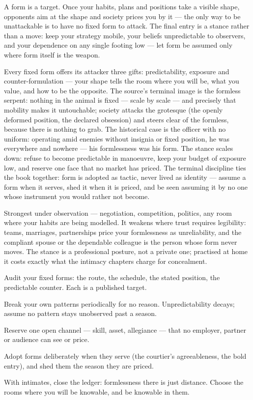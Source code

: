 \begin{core}
A form is a target. Once your habits, plans and positions take a visible shape, opponents aim at the shape and society prices you by it --- the only way to be unattackable is to have no fixed form to attack. The final entry is a stance rather than a move: keep your strategy mobile, your beliefs unpredictable to observers, and your dependence on any single footing low --- let form be assumed only where form itself is the weapon.
\end{core}
\begin{mechanism}
Every fixed form offers its attacker three gifts: predictability, exposure and counter-formulation --- your shape tells the room where you will be, what you value, and how to be the opposite. The source's terminal image is the formless serpent: nothing in the animal is fixed --- scale by scale --- and precisely that mobility makes it untouchable; society attacks the grotesque (the openly deformed position, the declared obsession) and steers clear of the formless, because there is nothing to grab. The historical case is the officer with no uniform: operating amid enemies without insignia or fixed position, he was everywhere and nowhere --- his formlessness was his form. The stance scales down: refuse to become predictable in manoeuvre, keep your budget of exposure low, and reserve one face that no market has priced. The terminal discipline ties the book together: form is adopted as tactic, never lived as identity --- assume a form when it serves, shed it when it is priced, and be seen assuming it by no one whose instrument you would rather not become.
\end{mechanism}
\begin{conditions}
Strongest under observation --- negotiation, competition, politics, any room where your habits are being modelled. It weakens where trust requires legibility: teams, marriages, partnerships price your formlessness as unreliability, and the compliant spouse or the dependable colleague is the person whose form never moves. The stance is a professional posture, not a private one; practised at home it costs exactly what the intimacy chapters charge for concealment.
\end{conditions}
\begin{application}
  \item Audit your fixed forms: the route, the schedule, the stated position, the predictable counter. Each is a published target.
  \item Break your own patterns periodically for no reason. Unpredictability decays; assume no pattern stays unobserved past a season.
  \item Reserve one open channel --- skill, asset, allegiance --- that no employer, partner or audience can see or price.
  \item Adopt forms deliberately when they serve (the courtier's agreeableness, the bold entry), and shed them the season they are priced.
  \item With intimates, close the ledger: formlessness there is just distance. Choose the rooms where you will be knowable, and be knowable in them.
\end{application}
